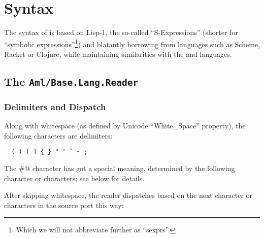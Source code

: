 
\chapter{Syntax}
\label{ch:aml-base-syntax}

The syntax of \AmlBase is based on Lisp-1, the so-called ``S-Expressions'' (shorter for ``symbolic expressions''\footnote{Which we will not abbreviate further as ``sexprs''.}) and blatantly borrowing from languages such as Scheme, Racket or Clojure, while maintaining similarities with the \Aml and \AmlCore languages. 




\section[The Aml/Base.Lang.Reader]{The \lstinline!Aml/Base.Lang.Reader!}
\label{sec:aml-base-lang-reader}




\subsection{Delimiters and Dispatch}
\label{subsec:aml-base-lang-reader-delimiters-dispatch}

Along with whitespace (as defined by Unicode ``White\_Space'' property), the following characters are delimiters:

\begin{lstlisting}
  ( ) [ ] { } " ' ` ~ ;
\end{lstlisting}

The \lstinline@#@ character has got a special meaning, determined by the following character or characters; see below for details. 

After skipping whitespace, the \AmlBase reader dispatches based on the next character or characters in the source port this way:

